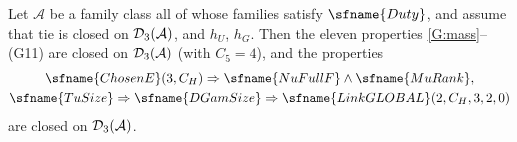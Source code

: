 \begin{proposition}\label{pf:top-shape:linkgl}
Let $\mathcal A$ be a family class all of whose families satisfy $\sfname{Duty}$, and assume that $\mathrm{tie}$ is closed
on $\mathcal{D}_3(\mathcal A)$, and $h_U$, $h_G$. Then the eleven properties \ref{G:mass}--(G11) are closed on
$\mathcal{D}_3(\mathcal A)$ (with $C_5=4$), and the properties
\begin{gather*}
\sfname{ChosenE}(3,C_H)\Rightarrow\sfname{NuFullF}\wedge\sfname{MuRank},\\
\sfname{TuSize}\Rightarrow\sfname{DGamSize}\Rightarrow\sfname{LinkGLOBAL}(2,C_H,3,2,0)
\end{gather*}
are closed on $\mathcal{D}_3(\mathcal A)$.
\end{proposition}

